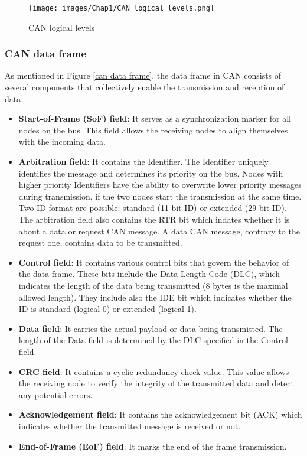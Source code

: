 \begin{figure}[H]
\begin{center}
\texttt{[image: images/Chap1/CAN logical levels.png]}\\
\caption{CAN logical levels}
\label{can logical levels}
\end{center}
\end{figure}

\subsubsection{CAN data frame}
As mentioned in Figure \ref{can data frame}, the data frame in CAN consists of several components that collectively enable the transmission and reception of data. \cite{R12}

\begin{itemize}
    \item \textbf{Start-of-Frame (SoF) field}: It serves as a synchronization marker for all nodes on the bus. This field allows the receiving nodes to align themselves with the incoming data.
    
    \item \textbf{Arbitration field}: It contains the Identifier. The Identifier uniquely identifies the message and determines its priority on the bus. Nodes with higher priority Identifiers have the ability to overwrite lower priority messages during transmission, if the two nodes start the transmission at the same time.
    Two ID format are possible: standard (11-bit ID) or extended (29-bit ID).
    The arbitration field also contains the RTR bit which indates whether it is about a data or request CAN message. A data CAN message, contrary to the request one, contains data to be transmitted.

    \item \textbf{Control field}: It contains various control bits that govern the behavior of the data frame. These bits include the Data Length Code (DLC), which indicates the length of the data being transmitted (8 bytes is the maximal allowed length). They include also the IDE bit which indicates whether the ID is standard (logical 0) or extended (logical 1).

    \item \textbf{Data field}: It carries the actual payload or data being transmitted. The length of the Data field is determined by the DLC specified in the Control field.

    \item \textbf{CRC field}: It contains a cyclic redundancy check value. This value allows the receiving node to verify the integrity of the transmitted data and detect any potential errors.

    \item \textbf{Acknowledgement field}: It contains the acknowledgement bit (ACK) which indicates whether the transmitted message is received or not.

    \item \textbf{End-of-Frame (EoF) field}: It marks the end of the frame transmission.
\end{itemize}

